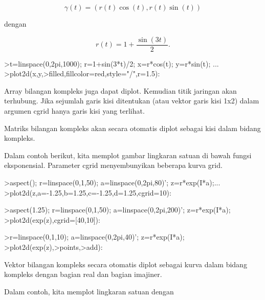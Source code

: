 \documentclass[a4paper,10pt]{article}
\begin{document}
\begin{eulernotebook}
\begin{eulercomment}
\begin{eulercomment}
\begin{eulercomment}
\begin{eulercomment}
\begin{eulercomment}
\begin{eulercomment}
\begin{eulercomment}
\begin{eulercomment}
\begin{eulercomment}
\begin{eulercomment}
\begin{eulercomment}
\begin{eulercomment}
\begin{eulercomment}
\begin{eulercomment}
\begin{eulercomment}
\end{eulercomment}
\begin{eulerformula}
\[
\gamma(t) = (r(t) \cos(t), r(t) \sin(t))
\]
\end{eulerformula}
\begin{eulercomment}
dengan

\end{eulercomment}
\begin{eulerformula}
\[
r(t) = 1 + \dfrac{\sin(3t)}{2}.
\]
\end{eulerformula}
\begin{eulerprompt}
>t=linspace(0,2pi,1000); r=1+sin(3*t)/2; x=r*cos(t); y=r*sin(t); ...
>plot2d(x,y,>filled,fillcolor=red,style="/",r=1.5):
\end{eulerprompt}
\begin{eulercomment}
Array bilangan kompleks juga dapat diplot. Kemudian titik jaringan
akan terhubung. Jika sejumlah garis kisi ditentukan (atau vektor garis
kisi 1x2) dalam argumen cgrid hanya garis kisi yang terlihat.

Matriks bilangan kompleks akan secara otomatis diplot sebagai kisi
dalam bidang kompleks.

Dalam contoh berikut, kita memplot gambar lingkaran satuan di bawah
fungsi eksponensial. Parameter cgrid menyembunyikan beberapa kurva
grid.
\end{eulercomment}
\begin{eulerprompt}
>aspect(); r=linspace(0,1,50); a=linspace(0,2pi,80)'; z=r*exp(I*a);...
>plot2d(z,a=-1.25,b=1.25,c=-1.25,d=1.25,cgrid=10):
\end{eulerprompt}
\begin{eulerprompt}
>aspect(1.25); r=linspace(0,1,50); a=linspace(0,2pi,200)'; z=r*exp(I*a);
>plot2d(exp(z),cgrid=[40,10]):
\end{eulerprompt}
\begin{eulerprompt}
>r=linspace(0,1,10); a=linspace(0,2pi,40)'; z=r*exp(I*a);
>plot2d(exp(z),>points,>add):
\end{eulerprompt}
\begin{eulercomment}
Vektor bilangan kompleks secara otomatis diplot sebagai kurva dalam
bidang kompleks dengan bagian real dan bagian imajiner.

Dalam contoh, kita memplot lingkaran satuan dengan


\end{eulercomment}
\end{eulercomment}
\end{eulercomment}
\end{eulercomment}
\end{eulercomment}
\end{eulercomment}
\end{eulercomment}
\end{eulercomment}
\end{eulercomment}
\end{eulercomment}
\end{eulercomment}
\end{eulercomment}
\end{eulercomment}
\end{eulercomment}
\end{eulercomment}
\end{eulernotebook}
\end{document}
